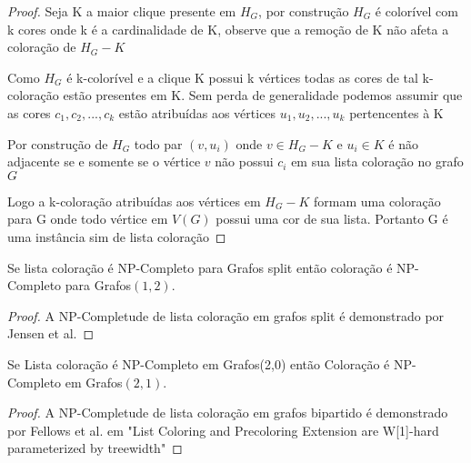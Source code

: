 \begin{proof}
	Seja K a maior clique presente em $H_G$, por construção $H_G$ é colorível com k cores onde k é a cardinalidade de K, observe que a remoção de K não afeta a coloração de $H_G - K$
	
	Como $H_G$ é k-colorível e a clique K possui k vértices todas as cores de tal k-coloração estão presentes em K. Sem perda de generalidade podemos assumir que as cores $c_1,c_2,...,c_k$ estão atribuídas aos vértices $u_1,u_2,...,u_k$ pertencentes à K
	
	Por construção de $H_G$ todo par $(v,u_i)$ onde $v \in H_G - K$ e $u_i \in K$ é não adjacente se e somente se o vértice $v$ não possui $c_i$ em sua lista coloração no grafo $G$
	
	Logo a k-coloração atribuídas aos vértices em $H_G - K$ formam uma coloração para G onde todo vértice em $V(G)$ possui uma cor de sua lista. Portanto G é uma instância sim de lista coloração
\end{proof}
\begin{corolario}
	Se lista coloração é NP-Completo para Grafos split então coloração é NP-Completo para Grafos$(1,2)$.
	\begin{proof}
		A NP-Completude de lista coloração em grafos split é demonstrado por Jensen et al.\cite{jansen1997}
	\end{proof}
\end{corolario}
\begin{corolario}
	Se Lista coloração é NP-Completo em Grafos(2,0) então Coloração é NP-Completo em Grafos$(2,1)$.
	\begin{proof}
		A NP-Completude de lista coloração em grafos bipartido é demonstrado por Fellows et al. em "List Coloring and Precoloring Extension are W[1]-hard parameterized by treewidth"
	\end{proof}
\end{corolario}    
